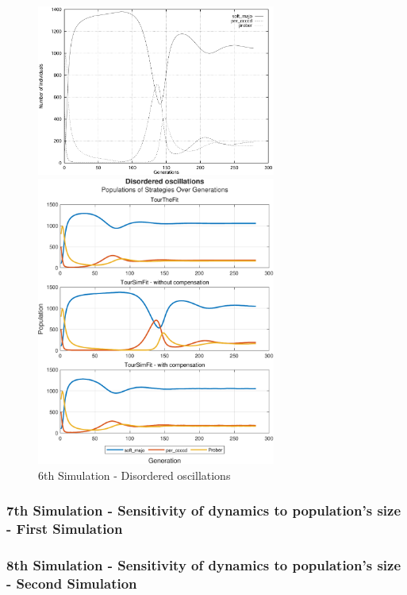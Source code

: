 \documentclass[12pt]{article}
\begin{document}
	\begin{figure}[h]
	      \centering
		  \includegraphics[width=0.7\textwidth]{RefPaperFigures/fig6.jpeg}\par\vspace{0.5em}
	      \includegraphics[width=0.7\textwidth]{Disordered oscillations.pdf}
	      \caption{6th Simulation - Disordered oscillations}
	      \label{fig:Disordered oscillations}
	\end{figure}

\subsubsection{7th Simulation - Sensitivity of dynamics to population's size - First Simulation}

\subsubsection{8th Simulation - Sensitivity of dynamics to population's size - Second Simulation}
\end{document}

